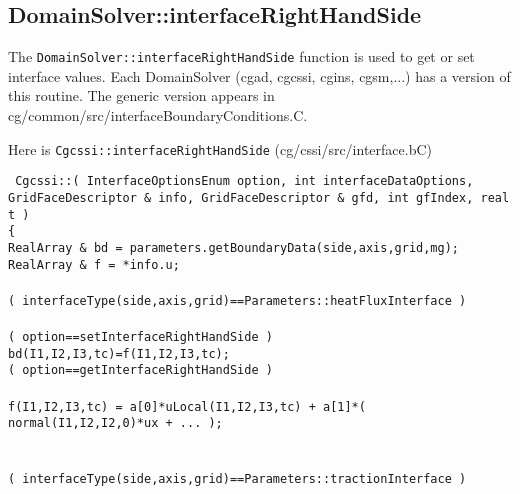 \clearpage
\subsection{DomainSolver::interfaceRightHandSide} \label{sec:DomainSolver::interfaceRightHandSide}


The {\tt DomainSolver::interfaceRightHandSide} function is used to get or set interface values.
Each DomainSolver (cgad, cgcssi, cgins, cgsm,...) has a version of this routine. The generic
version appears in cg/common/src/interfaceBoundaryConditions.C. 


Here is {\tt Cgcssi::interfaceRightHandSide} (cg/cssi/src/interface.bC)
\begin{flushleft}\tt\small
Cgcssi::( InterfaceOptionsEnum option, int interfaceDataOptions,  \\
 \qquad\quad       GridFaceDescriptor \& info, GridFaceDescriptor \& gfd, int gfIndex, real t ) \\
\{  \\
\ia  RealArray \& bd = parameters.getBoundaryData(side,axis,grid,mg); \\
\ia  RealArray \& f = *info.u;  \\
\ia \\
\ia  \IF( interfaceType(side,axis,grid)==Parameters::heatFluxInterface ) \\
\ib     {} \\
\ib     \IF( option==setInterfaceRightHandSide ) \\
\ic       bd(I1,I2,I3,tc)=f(I1,I2,I3,tc);    \\
\ib     \ELSEIF( option==getInterfaceRightHandSide )  \\
\ic       {} \\
\ic       f(I1,I2,I3,tc) = a[0]*uLocal(I1,I2,I3,tc) + a[1]*( normal(I1,I2,I2,0)*ux + ... ); \\
\ib     \END \\
\ia \\
\ia  \ELSEIF( interfaceType(side,axis,grid)==Parameters::tractionInterface ) \\
\ib     {} \\ 

\end{flushleft}
